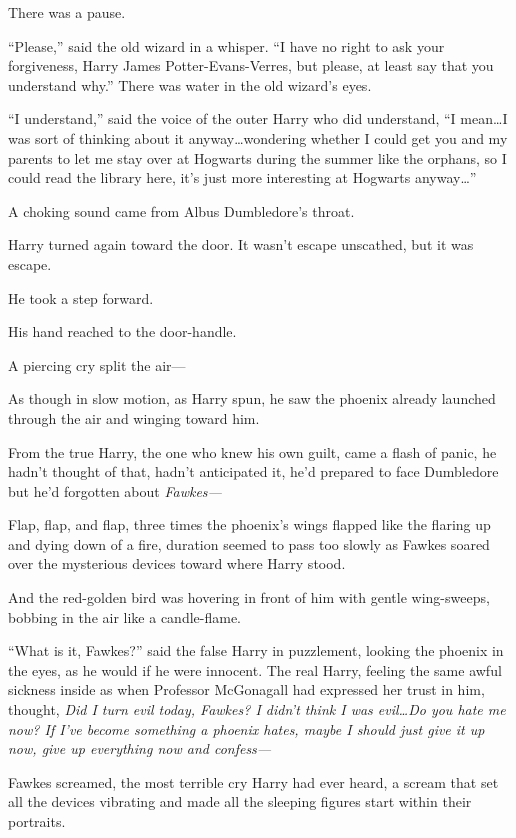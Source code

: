 There was a pause.

“Please,” said the old wizard in a whisper. “I have no right to ask your forgiveness, Harry James Potter-Evans-Verres, but please, at least say that you understand why.” There was water in the old wizard’s eyes.

“I understand,” said the voice of the outer Harry who did understand, “I mean…I was sort of thinking about it anyway…wondering whether I could get you and my parents to let me stay over at Hogwarts during the summer like the orphans, so I could read the library here, it’s just more interesting at Hogwarts anyway…”

A choking sound came from Albus Dumbledore’s throat.

Harry turned again toward the door. It wasn’t escape unscathed, but it was escape.

He took a step forward.

His hand reached to the door-handle.

A piercing cry split the air—

As though in slow motion, as Harry spun, he saw the phoenix already launched through the air and winging toward him.

From the true Harry, the one who knew his own guilt, came a flash of panic, he hadn’t thought of that, hadn’t anticipated it, he’d prepared to face Dumbledore but he’d forgotten about \emph{Fawkes—}

Flap, flap, and flap, three times the phoenix’s wings flapped like the flaring up and dying down of a fire, duration seemed to pass too slowly as Fawkes soared over the mysterious devices toward where Harry stood.

And the red-golden bird was hovering in front of him with gentle wing-sweeps, bobbing in the air like a candle-flame.

“What is it, Fawkes?” said the false Harry in puzzlement, looking the phoenix in the eyes, as he would if he were innocent. The real Harry, feeling the same awful sickness inside as when Professor McGonagall had expressed her trust in him, thought, \emph{Did I turn evil today, Fawkes? I didn’t think I was evil…Do you hate me now? If I’ve become something a phoenix hates, maybe I should just give it up now, give up everything now and confess—}

Fawkes screamed, the most terrible cry Harry had ever heard, a scream that set all the devices vibrating and made all the sleeping figures start within their portraits.

